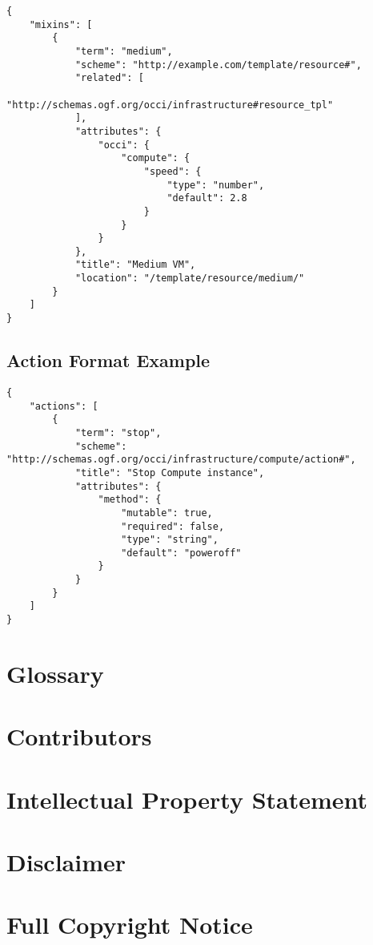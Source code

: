 \documentclass[10pt,a4paper]{article}
\begin{document}
\begin{lstlisting}
{
    "mixins": [
        {
            "term": "medium",
            "scheme": "http://example.com/template/resource#",
            "related": [
                "http://schemas.ogf.org/occi/infrastructure#resource_tpl"
            ],
            "attributes": {
                "occi": {
                    "compute": {
                        "speed": {
                            "type": "number",
                            "default": 2.8
                        }
                    }
                }
            },
            "title": "Medium VM",
            "location": "/template/resource/medium/"
        }
    ]
}
\end{lstlisting}

\subsection{Action Format Example}
\label{sec:example_action}

\begin{lstlisting}
{
    "actions": [
        {
            "term": "stop",
            "scheme": "http://schemas.ogf.org/occi/infrastructure/compute/action#",
            "title": "Stop Compute instance",
            "attributes": {
                "method": {
                    "mutable": true,
                    "required": false,
                    "type": "string",
                    "default": "poweroff"
                }
            }
        }
    ]
}
\end{lstlisting}

\section{Glossary}
\label{sec:glossary}


\section{Contributors}


\section{Intellectual Property Statement}


\section{Disclaimer}


\section{Full Copyright Notice}




\end{document}

